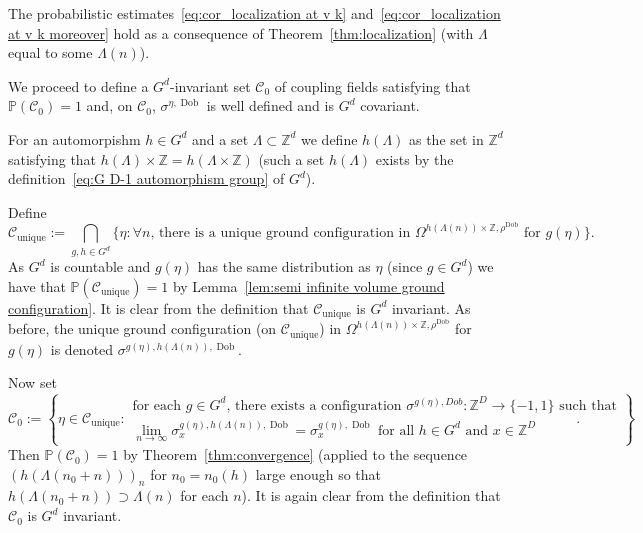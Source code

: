 \documentclass[11pt, reqno]{amsart}
\newcommand{\Z}{\mathbb{Z}}
\DeclareMathOperator{\Dob}{Dob}
\renewcommand{\P}{\mathbb{P}}
\numberwithin{equation}{section}
\begin{document}
The probabilistic estimates~\eqref{eq:cor_localization at v k} and~\eqref{eq:cor_localization at v k moreover} hold as a consequence of Theorem~\ref{thm:localization} (with $\Lambda$ equal to some $\Lambda(n)$).

We proceed to define a $G^d$-invariant set $\mathcal{C}_0$ of coupling fields satisfying that $\P(\mathcal{C}_0)=1$ and, on $\mathcal{C}_0$, $\sigma^{\eta,\Dob}$ is well defined and is $G^d$ covariant.

For an automorpishm $h\in G^d$ and a set $\Lambda\subset\Z^d$ we define $h(\Lambda)$ as the set in $\Z^d$ satisfying that $h(\Lambda)\times\Z=h(\Lambda\times\Z)$ (such a set $h(\Lambda)$ exists by the definition~\eqref{eq:G D-1 automorphism group} of $G^d$).

Define
\begin{equation}
\mathcal{C}_\text{unique}:=\bigcap_{g,h\in G^d} \{\eta\colon \text{$\forall n$, there is a unique ground configuration in $\Omega^{h(\Lambda(n))\times\Z,\rho^{\Dob}}$ for $g(\eta)$}\}.
\end{equation}
As $G^d$ is countable and $g(\eta)$ has the same distribution as $\eta$ (since $g\in G^d$) we have that $\P(\mathcal{C}_\text{unique})=1$ by Lemma~\ref{lem:semi infinite volume ground configuration}. It is clear from the definition that $\mathcal{C}_\text{unique}$ is $G^d$ invariant. As before, the unique ground configuration (on $\mathcal{C}_\text{unique}$) in $\Omega^{h(\Lambda(n))\times\Z,\rho^{\Dob}}$ for $g(\eta)$ is denoted $\sigma^{g(\eta),h(\Lambda(n)),\Dob}$.

Now set
\begin{equation}
\mathcal{C}_0 := \left\{\eta\in\mathcal{C}_\text{unique}\colon \substack{\text{for each $g\in G^d$, there exists a configuration $\sigma^{g(\eta),Dob}:\Z^D\to\{-1,1\}$ such that}\\\text{$\lim_{n\to\infty}\sigma^{g(\eta),h(\Lambda(n)),\Dob}_x = \sigma^{g(\eta),\Dob}_x$ for all $h\in G^d$ and $x\in\Z^D$}}\right\}.
\end{equation}
Then $\P(\mathcal{C}_0)=1$ by Theorem~\ref{thm:convergence} (applied to the sequence $(h(\Lambda(n_0+n)))_n$ for $n_0=n_0(h)$ large enough so that $h(\Lambda(n_0+n))\supset\Lambda(n)$ for each $n$). It is again clear from the definition that $\mathcal{C}_0$ is $G^d$ invariant. 
\end{document}
